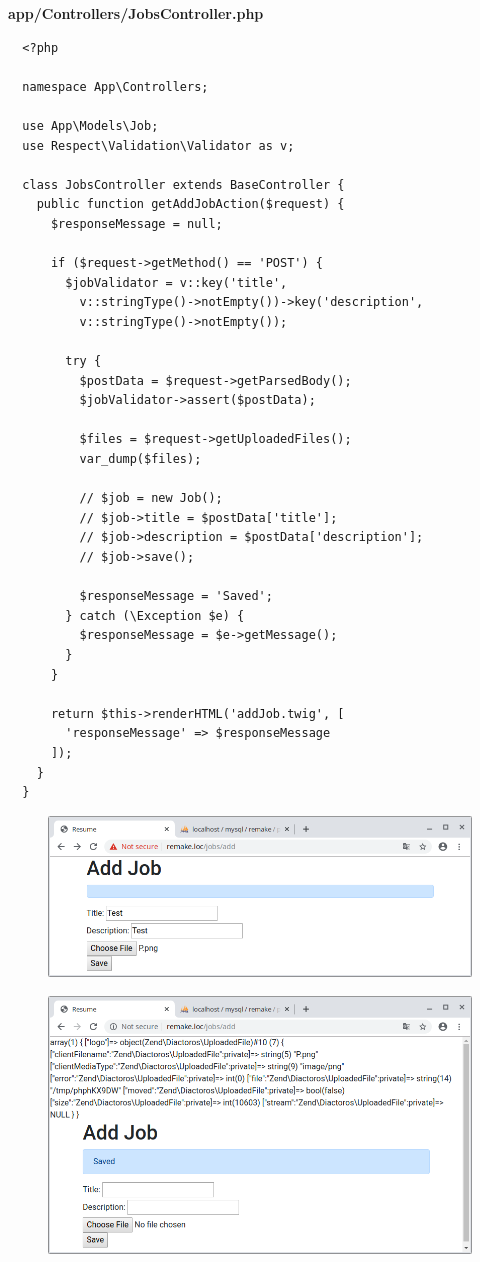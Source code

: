 \documentclass{article}
\begin{document}
\textbf{app/Controllers/JobsController.php}
\begin{verbatim}
  <?php

  namespace App\Controllers;

  use App\Models\Job;
  use Respect\Validation\Validator as v;

  class JobsController extends BaseController {
    public function getAddJobAction($request) {
      $responseMessage = null;

      if ($request->getMethod() == 'POST') {
        $jobValidator = v::key('title',
          v::stringType()->notEmpty())->key('description',
          v::stringType()->notEmpty());

        try {
          $postData = $request->getParsedBody();
          $jobValidator->assert($postData);

          $files = $request->getUploadedFiles();
          var_dump($files);

          // $job = new Job();
          // $job->title = $postData['title'];
          // $job->description = $postData['description'];
          // $job->save();

          $responseMessage = 'Saved';
        } catch (\Exception $e) {
          $responseMessage = $e->getMessage();
        }
      }

      return $this->renderHTML('addJob.twig', [
        'responseMessage' => $responseMessage
      ]);
    }
  }
\end{verbatim}

\begin{figure}[h!]
  \centering
  \includegraphics[scale=0.5]{./Pictures/177_prueba_vardump.png}
\end{figure}

\begin{figure}[h!]
  \centering
  \includegraphics[scale=0.5]{./Pictures/178_prueba_vardump.png}
\end{figure}
\end{document}
